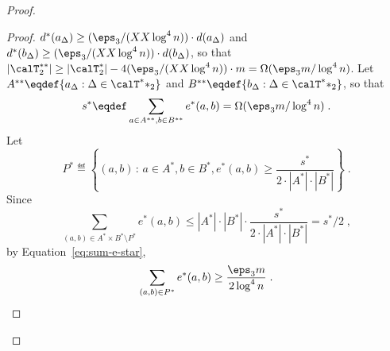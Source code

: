 \begin{proof}
\begin{proof}
$d^*(a_\Delta) \geq (\eps_3/(XX\log^4 n))\cdot d(a_\Delta)$ and 
$d^*(b_\Delta) \geq (\eps_3/(XX\log^4 n))\cdot d(b_\Delta)$, so that
$|\calT^{**}_2| \geq  |\calT^*_2| - 4 (\eps_3/(XX\log^4 n))\cdot m = \Omega(\eps_3 m/\log^4 n)$.
Let $A^{**} \eqdef \{a_\Delta: \Delta \in \calT^**_2\}$ and $B^{**} \eqdef \{b_\Delta: \Delta \in \calT^**_2\}$,
so that 
\begin{equation}\label{eq:sum-e-double-star}
s^{*} \eqdef \sum_{a\in A^{**}, b\in B^{**}} e^*(a,b) = \Omega(\eps_3 m/\log^4 n)\;.
\end{equation}
\fi
Let 
\begin{equation}\label{eq:def-P-star}
P^{*}\eqdef \left\{(a,b)\,:\, a\in A^{*},b\in B^{*}, e^*(a,b) \geq \frac{s^*}{2\cdot |A^{*}|\cdot|B^{*}|} \right\}\;.
\end{equation}
Since 
\begin{equation}\sum_{(a,b)\in A^*\times B^* \setminus P^{*}} e^*(a,b) \leq |A^*|\cdot |B^*| \cdot \frac{s^*}{2\cdot |A^{*}|\cdot|B^{*}|} = s^*/2\;,
\end{equation}
by Equation~\eqref{eq:sum-e-star},
\begin{equation}\label{eq:sum-P-star}
\sum_{(a,b)\in P^{*}} e^*(a,b) \geq \frac{\eps_3 m}{2\log^4 n}\;.
\end{equation}


\end{proof}
\end{proof}
